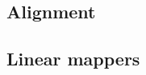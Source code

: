 \documentclass[11pt]{ucscthesis}
\begin{document}



\subsection{Alignment}

\subsection{Linear mappers}
\end{document}
